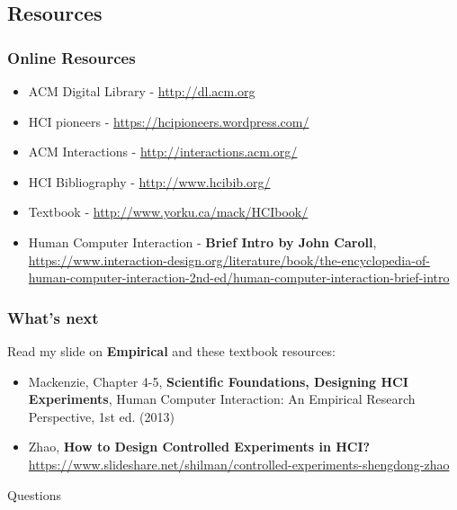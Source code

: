 \documentclass{beamer}
\begin{document}
\subsection{Resources} %

\begin{frame}
\frametitle{Online Resources}
\begin{itemize}
	\item ACM Digital Library - \url{http://dl.acm.org}
	\item HCI pioneers - \url{https://hcipioneers.wordpress.com/}
	\item ACM Interactions - \url{http://interactions.acm.org/}
	\item HCI Bibliography - \url{http://www.hcibib.org/}
	\item Textbook - \url{http://www.yorku.ca/mack/HCIbook/}
	\item  Human Computer Interaction - \textbf{Brief Intro by John Caroll}, \url{https://www.interaction-design.org/literature/book/the-encyclopedia-of-human-computer-interaction-2nd-ed/human-computer-interaction-brief-intro}  
\end{itemize}
\end{frame}

\begin{frame}
\frametitle{What's next}
Read my slide on \textbf{Empirical} and these textbook resources:
\begin{itemize}
	\item Mackenzie, Chapter 4-5, \textbf{Scientific Foundations, Designing HCI Experiments},  Human Computer Interaction: An Empirical Research Perspective, 1st ed. (2013) 
	\item Zhao, \textbf{How to Design Controlled Experiments in HCI?} \url{https://www.slideshare.net/shilman/controlled-experiments-shengdong-zhao}\
\end{itemize}
\end{frame}


%

\begin{frame}
\Huge{\centerline{Questions}}
\end{frame}

\end{document}
